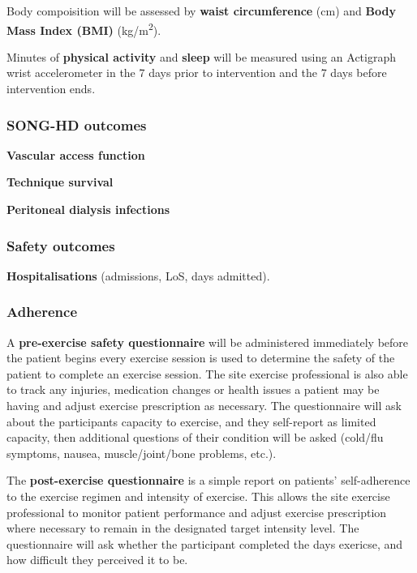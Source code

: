 \documentclass[
]{article}
\begin{document}
\label{outcome:body}
Body compoisition will be assessed by \textbf{waist circumference} (cm) and \textbf{Body Mass Index (BMI)} (kg/m\textsuperscript{2}).

\label{outcome:actigraph}
Minutes of \textbf{physical activity} and \textbf{sleep} will be measured using an Actigraph wrist accelerometer in the 7 days prior to intervention and the 7 days before intervention ends.

\hypertarget{song-outcomes}{
  \subsubsection{SONG-HD outcomes}\label{song-outcomes}}

\textbf{Vascular access function}

\textbf{Technique survival}

\textbf{Peritoneal dialysis infections}

\hypertarget{safety-outcomes}{
  \subsubsection{Safety outcomes}\label{safety-outcomes}}

\textbf{Hospitalisations} (admissions, LoS, days admitted).

\hypertarget{adherence-outcomes}{
  \subsubsection{Adherence}\label{adherence-outcomes}}
  
A \textbf{pre-exercise safety questionnaire} will be administered immediately before the patient begins every exercise session is used to determine the safety of the patient to complete an exercise session. The site exercise professional is also able to track any injuries, medication changes or health issues a patient may be having and adjust exercise prescription as necessary.
The questionnaire will ask about the participants capacity to exercise, and they self-report as limited capacity, then additional questions of their condition will be asked (cold/flu symptoms, nausea, muscle/joint/bone problems, etc.).

The \textbf{post-exercise questionnaire} is a simple report on patients’ self-adherence to the exercise regimen and intensity of exercise. This allows the site exercise professional to monitor patient performance and adjust exercise prescription where necessary to remain in the designated target intensity level.
The questionnaire will ask whether the participant completed the days exericse, and how difficult they perceived it to be.
\end{document}
